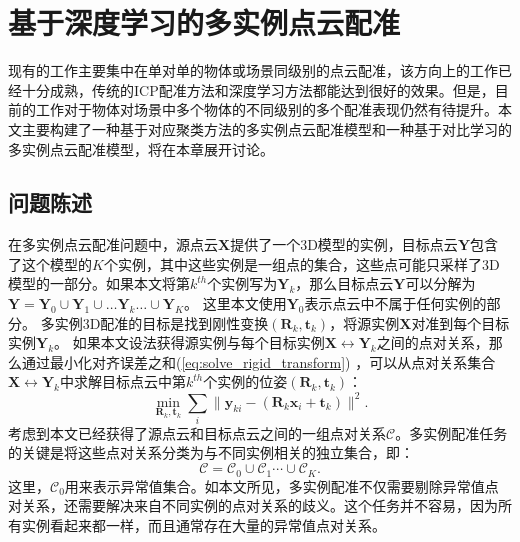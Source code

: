 \chapter{基于深度学习的多实例点云配准}
现有的工作主要集中在单对单的物体或场景同级别的点云配准，该方向上的工作已经十分成熟，传统的ICP配准方法\cite{barath2021progressive, li2020evaluation, shi2020improved}和深度学习方法\cite{qin2022geometric,barath2019progressive,barath2021progressive}都能达到很好的效果。但是，目前的工作对于物体对场景中多个物体的不同级别的多个配准表现仍然有待提升。本文主要构建了一种基于对应聚类方法的多实例点云配准模型和一种基于对比学习的多实例点云配准模型，将在本章展开讨论。
\section{问题陈述}

在多实例点云配准问题中，源点云$\boldsymbol{X}$提供了一个3D模型的实例，目标点云$\boldsymbol{Y}$包含了这个模型的$K$个实例，其中这些实例是一组点的集合，这些点可能只采样了3D模型的一部分。如果本文将第$k^{th}$个实例写为$\boldsymbol{Y}_k$，那么目标点云$\boldsymbol{Y}$可以分解为$
\boldsymbol{Y} = \boldsymbol{Y}_0 \cup \boldsymbol{Y}_1 \cup \ldots \boldsymbol{Y}_k \ldots \cup \boldsymbol{Y}_K$。
这里本文使用$\boldsymbol{Y}_0$表示点云中不属于任何实例的部分。
多实例3D配准的目标是找到刚性变换$(\boldsymbol{R}_k, \boldsymbol{t}_k)$，将源实例$\boldsymbol{X}$对准到每个目标实例$\boldsymbol{Y}_k$。
如果本文设法获得源实例与每个目标实例$\boldsymbol{X} \leftrightarrow \boldsymbol{Y}_k$之间的点对关系，那么通过最小化对齐误差之和(\ref{eq:solve_rigid_transform}) \cite{levinson2020analysis}，可以从点对关系集合$\boldsymbol{X}\leftrightarrow \boldsymbol{Y}_k$中求解目标点云中第$k^{th}$个实例的位姿$(\boldsymbol{R}_k, \boldsymbol{t}_k)$：
\begin{equation}
\underset{\boldsymbol{R}_k,\boldsymbol{t}_k}{\min}\sum_i{\parallel}\boldsymbol{y}_{ki}-(\boldsymbol{R}_k\boldsymbol{x}_i+\boldsymbol{t}_k)\parallel ^2.
\label{eq:solve_rigid_transform}
\end{equation}
考虑到本文已经获得了源点云和目标点云之间的一组点对关系$\mathcal{C}$。多实例配准任务的关键是将这些点对关系分类为与不同实例相关的独立集合，即：
\begin{equation}
\mathcal{C} = \mathcal{C}_0 \cup \mathcal{C}_1\cdots \cup \mathcal{C}_K.
\end{equation}
这里，$\mathcal{C}_0$用来表示异常值集合。如本文所见，多实例配准不仅需要剔除异常值点对关系，还需要解决来自不同实例的点对关系的歧义。这个任务并不容易，因为所有实例看起来都一样，而且通常存在大量的异常值点对关系。

